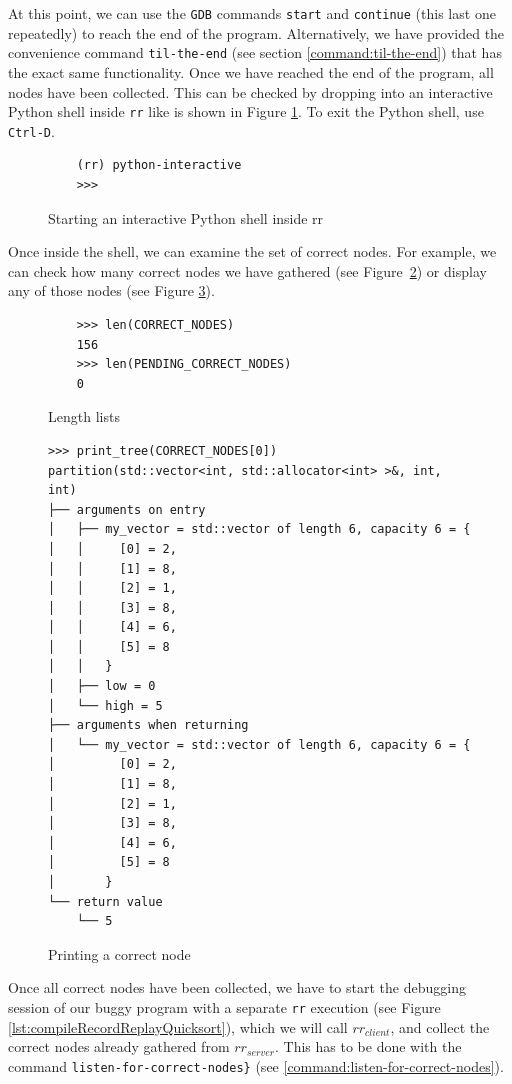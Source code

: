 At this point, we can use the \verb|GDB| commands \verb|start| and \verb|continue| (this last one repeatedly) to reach the end of the program.
Alternatively, we have provided the convenience command \verb|til-the-end| (see section \ref{command:til-the-end}) that has the exact same functionality.
Once we have reached the end of the program, all nodes have been collected. This can be checked by dropping into an interactive Python shell inside \verb|rr| like is shown in Figure \ref{fig:python-interactive}. To exit the Python shell, use \verb|Ctrl-D|.
\begin{figure}[h]
    \centering
    \caption{Starting an interactive Python shell inside rr}
    \label{fig:python-interactive}
    \begin{verbatim}
    (rr) python-interactive
    >>>
    \end{verbatim}
\end{figure}
Once inside the shell, we can examine the set of correct nodes. For example, we can check how many correct nodes we have gathered (see Figure~\ref{fig:lengthLists}) or display any of those nodes (see Figure \ref{fig:printCorrectNode}).
\begin{figure}[h]
    \centering
    \caption{Length lists}
    \label{fig:lengthLists}
    \begin{verbatim}
    >>> len(CORRECT_NODES)
    156
    >>> len(PENDING_CORRECT_NODES)
    0
    \end{verbatim}
\end{figure}

\begin{figure}[h]
    \centering
    \caption{Printing a correct node}
    \label{fig:printCorrectNode}
    \begin{verbatim}
>>> print_tree(CORRECT_NODES[0])
partition(std::vector<int, std::allocator<int> >&, int, int)
├── arguments on entry                                      
│   ├── my_vector = std::vector of length 6, capacity 6 = {                 
│   │     [0] = 2,                                                                                           
│   │     [1] = 8,                     
│   │     [2] = 1,                     
│   │     [3] = 8,                     
│   │     [4] = 6,                     
│   │     [5] = 8                     
│   │   }                      
│   ├── low = 0                              
│   └── high = 5                        
├── arguments when returning                       
│   └── my_vector = std::vector of length 6, capacity 6 = {           
│         [0] = 2,
│         [1] = 8,
│         [2] = 1,
│         [3] = 8,
│         [4] = 6,
│         [5] = 8
│       }
└── return value
    └── 5
    \end{verbatim}
\end{figure}
Once all correct nodes have been collected, we have to start the debugging session of our buggy program with a separate \verb|rr| execution (see Figure \ref{lst:compileRecordReplayQuicksort}), which we will call \(rr_{client}\), and collect the correct nodes already gathered from \(rr_{server}\). This has to be done with the command \verb|listen-for-correct-nodes}| (see \ref{command:listen-for-correct-nodes}). 

